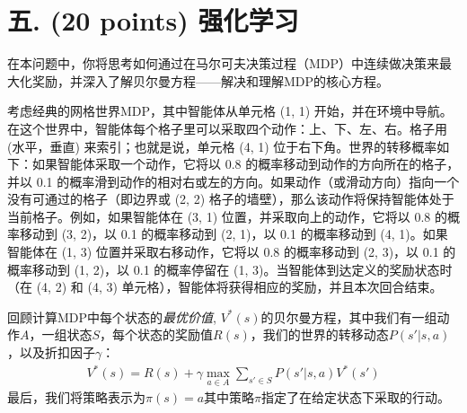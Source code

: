 \documentclass[8pt]{article}
\begin{document}
\begin{enumerate}[(i)]
    \end{enumerate}

\newpage
\section*{五. (20 points) 强化学习}

在本问题中，你将思考如何通过在马尔可夫决策过程（MDP）中连续做决策来最大化奖励，并深入了解贝尔曼方程——解决和理解MDP的核心方程。

考虑经典的网格世界MDP，其中智能体从单元格 (1, 1) 开始，并在环境中导航。在这个世界中，智能体每个格子里可以采取四个动作：上、下、左、右。格子用 (水平，垂直) 来索引；也就是说，单元格 (4, 1) 位于右下角。世界的转移概率如下：如果智能体采取一个动作，它将以 0.8 的概率移动到动作的方向所在的格子，并以 0.1 的概率滑到动作的相对右或左的方向。如果动作（或滑动方向）指向一个没有可通过的格子（即边界或 (2, 2) 格子的墙壁），那么该动作将保持智能体处于当前格子。例如，如果智能体在 (3, 1) 位置，并采取向上的动作，它将以 0.8 的概率移动到 (3, 2)，以 0.1 的概率移动到 (2, 1)，以 0.1 的概率移动到 (4, 1)。如果智能体在 (1, 3) 位置并采取右移动作，它将以 0.8 的概率移动到 (2, 3)，以 0.1 的概率移动到 (1, 2)，以 0.1 的概率停留在 (1, 3)。当智能体到达定义的奖励状态时（在 (4, 2) 和 (4, 3) 单元格），智能体将获得相应的奖励，并且本次回合结束。

回顾计算MDP中每个状态的\textit{最优价值}, $V^{*}(s)$的贝尔曼方程，其中我们有一组动作$A$，一组状态$S$，每个状态的奖励值$R(s)$，我们的世界的转移动态$P(s' | s, a)$，以及折扣因子$\gamma$：
\begin{align*}
V^{*}(s) = R(s) + \gamma \max_{a \in A} \sum_{s' \in S} P(s' | s, a) V^{*}(s')
\end{align*}
最后，我们将策略表示为$\pi(s) = a$其中策略$\pi$指定了在给定状态下采取的行动。
\end{document}
